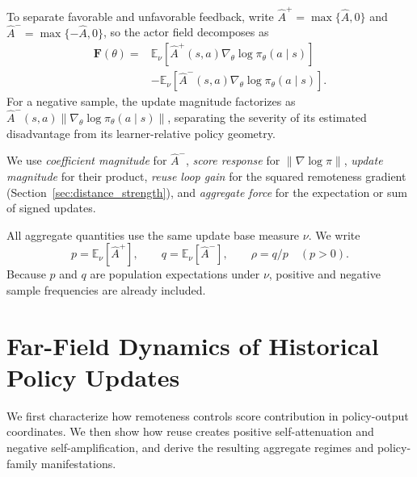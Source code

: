 \documentclass{article}
\theoremstyle{plain}
\theoremstyle{definition}
\theoremstyle{remark}
\begin{document}
To separate favorable and unfavorable feedback, write
\(\widehat A^{+}=\max\{\widehat A,0\}\) and
\(\widehat A^{-}=\max\{-\widehat A,0\}\), so the actor field decomposes as
\begin{equation}
\begin{aligned}
    \mathbf{F}(\theta)
    ={}&
    \mathbb{E}_{\nu}
    \left[
        \widehat{A}^{+}(s,a)
        \nabla_\theta \log \pi_\theta(a \mid s)
    \right] \\
    &-
    \mathbb{E}_{\nu}
    \left[
        \widehat{A}^{-}(s,a)
        \nabla_\theta \log \pi_\theta(a \mid s)
    \right].
\end{aligned}
\label{eq:signed_actor_decomposition}
\end{equation}
For a negative sample, the update magnitude factorizes as
$\widehat{A}^{-}(s,a)
\lVert\nabla_\theta \log \pi_\theta(a \mid s)\rVert$,
separating the severity of its estimated disadvantage from its
learner-relative policy geometry.

We use \emph{coefficient magnitude} for \(\widehat A^-\), \emph{score
response} for \(\|\nabla\log\pi\|\), \emph{update magnitude} for their
product, \emph{reuse loop gain} for the squared remoteness gradient
(Section~\ref{sec:distance_strength}), and \emph{aggregate force} for the
expectation or sum of signed updates.

All aggregate quantities use the same update base measure \(\nu\). We write
\begin{equation}
    p=\mathbb E_\nu[\widehat A^+],
    \qquad
    q=\mathbb E_\nu[\widehat A^-],
    \qquad
    \rho=q/p \quad (p>0).
    \label{eq:aggregate_masses}
\end{equation}
Because \(p\) and \(q\) are population expectations under \(\nu\), positive
and negative sample frequencies are already included.

\section{Far-Field Dynamics of Historical Policy Updates}
\label{sec:theory}

We first characterize how remoteness controls score contribution in
policy-output coordinates. We then show how reuse creates positive
self-attenuation and negative self-amplification, and derive the resulting
aggregate regimes and policy-family manifestations.
\end{document}
